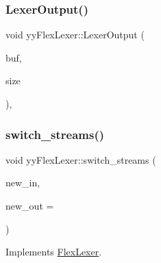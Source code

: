 \mbox{\label{classyyFlexLexer_ae037fa792625995f3f7b4dc65769d8f8}} 
\subsubsection{\texorpdfstring{Lexer\+Output()}{LexerOutput()}}
{\footnotesize\ttfamily void yy\+Flex\+Lexer\+::\+Lexer\+Output (\begin{DoxyParamCaption}\item[{const char $\ast$}]{buf,  }\item[{int}]{size }\end{DoxyParamCaption})\hspace{0.3cm}{\ttfamily [protected]}, {\ttfamily [virtual]}}

\mbox{\label{classyyFlexLexer_ae88d47b620670ef7a924f4fe1e70774b}} 
\subsubsection{\texorpdfstring{switch\+\_\+streams()}{switch\_streams()}}
{\footnotesize\ttfamily void yy\+Flex\+Lexer\+::switch\+\_\+streams (\begin{DoxyParamCaption}\item[{\hyperlink{FlexLexer_8h_ae50ff830f34b9e244163babb41a1552d}{F\+L\+E\+X\+\_\+\+S\+TD} istream $\ast$}]{new\+\_\+in,  }\item[{\hyperlink{FlexLexer_8h_ae50ff830f34b9e244163babb41a1552d}{F\+L\+E\+X\+\_\+\+S\+TD} ostream $\ast$}]{new\+\_\+out = {} }\end{DoxyParamCaption})\hspace{0.3cm}{\ttfamily [virtual]}}



Implements \hyperlink{classFlexLexer_a09dd0826a8540365a74c2167795bbc61}{Flex\+Lexer}.

\mbox{\label{classyyFlexLexer_ac72d57010353577c918e72eba3d8972a}} 
